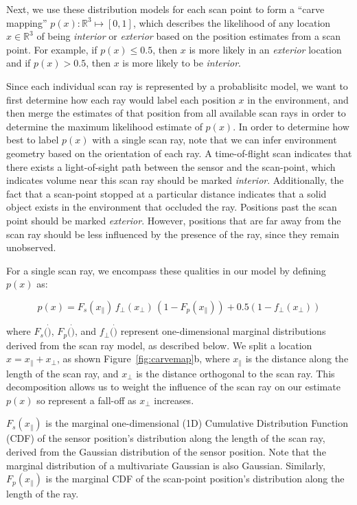 \documentclass[12pt,onecolumn,oneside]{book}
\begin{document}
Next, we use these distribution models for each scan point to form a ``carve mapping'' $p(x) : \mathbb{R}^3 \mapsto [0,1]$, which describes the likelihood of any location $x \in \mathbb{R}^3$ of being {\it interior} or {\it exterior} based on the position estimates from a scan point.  For example, if $p(x) \leq 0.5$, then $x$ is more likely in an {\it exterior} location and if $p(x) > 0.5$, then $x$ is more likely to be {\it interior}.  

Since each individual scan ray is represented by a probablisitc model, we want to first determine how each ray would label each position $x$ in the environment, and then merge the estimates of that position from all available scan rays in order to determine the maximum likelihood estimate of $p(x)$.  In order to determine how best to label $p(x)$ with a single scan ray, note that we can infer environment geometry based on the orientation of each ray.  A time-of-flight scan indicates that there exists a light-of-sight path between the sensor and the scan-point, which indicates volume near this scan ray should be marked {\it interior}.  Additionally, the fact that a scan-point stopped at a particular distance indicates that a solid object exists in the environment that occluded the ray.  Positions past the scan point should be marked {\it exterior}.  However, positions that are far away from the scan ray should be less influenced by the presence of the ray, since they remain unobserved.  

For a single scan ray, we encompass these qualities in our model by defining $p(x)$ as:

\begin{equation}
	p(x) = F_s(x_{\parallel}) \, f_{\perp}(x_{\perp}) \, (1 - F_p(x_{\parallel})) + 0.5 (1 - f_{\perp}(x_{\perp}))
	\label{eq:carvemap}
\end{equation}

where $F_s(\dot)$, $F_p(\dot)$, and $f_{\perp}(\dot)$ represent one-dimensional marginal distributions derived from the scan ray model, as described below.  We split a location $x = x_{\parallel} + x_{\perp}$, as shown Figure~\ref{fig:carvemap}b, where $x_{\parallel}$ is the distance along the length of the scan ray, and $x_{\perp}$ is the distance orthogonal to the scan ray.  This decomposition allows us to weight the influence of the scan ray on our estimate $p(x)$ so represent a fall-off as $x_{\perp}$ increases.

$F_s(x_{\parallel})$ is the marginal one-dimensional (1D) Cumulative Distribution Function (CDF) of the sensor position's distribution along the length of the scan ray, derived from the Gaussian distribution of the sensor position.  Note that the marginal distribution of a multivariate Gaussian is also Gaussian.  Similarly, $F_p(x_{\parallel})$ is the marginal CDF of the scan-point position's distribution along the length of the ray. 
\end{document}
